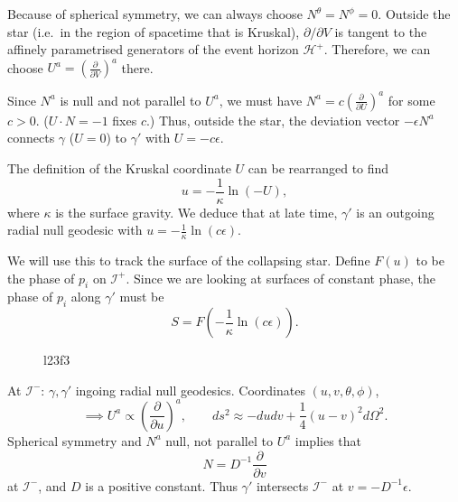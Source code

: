 Because of spherical symmetry, we can always choose $N^{\theta} = N^{\phi} = 0$.
Outside the star (i.e.~in the region of spacetime that is Kruskal), $\partial / \partial V$ is tangent to the affinely parametrised generators of the event horizon $\mathcal{H}^+$.
Therefore, we can choose $U^{a} = (\frac{\partial }{\partial V})^{a}$ there.

Since $N^{a}$ is null and not parallel to $U^{a}$, we must have $N^{a} = c (\frac{\partial }{\partial U})^{a}$ for some $c> 0$. ($U \cdot N = -1$ fixes $c$.)
Thus, outside the star, the deviation vector $- \epsilon N^{a}$ connects $\gamma$ ($U = 0$) to $\gamma'$ with $U = -c \epsilon$.

The definition of the Kruskal coordinate $U$ can be rearranged to find 
\begin{equation}
  u = - \frac{1}{\kappa} \ln(-U),
\end{equation}
where $\kappa$ is the surface gravity.
We deduce that at late time, $\gamma'$ is an outgoing radial null geodesic with $u = -\frac{1}{\kappa} \ln(c \epsilon)$.

We will use this to track the surface of the collapsing star.
Define $F(u)$ to be the phase of $p_i$ on $\mathscr{I}^+$. Since we are looking at surfaces of constant phase, the phase of $p_i$ along $\gamma'$ must be 
\begin{equation}
  \label{eq:23-star}
  S = F(-\frac{1}{\kappa} \ln(c \epsilon)).
\end{equation}

\begin{figure}[tbhp]
  \centering
  \caption{l23f3}
  \label{fig:l23f3}
\end{figure}

At $\mathscr{I}^-$: $\gamma, \gamma'$ ingoing radial null geodesics. Coordinates $(u, v, \theta, \phi)$,
\begin{equation}
  \implies U^{a} \propto \left( \frac{\partial }{\partial u} \right)^{a}, \qquad ds^2 \approx -du d v + \frac{1}{4} (u - v)^2 d \Omega^2.
\end{equation}
Spherical symmetry and $N^{a}$ null, not parallel to $U^{a}$ implies that 
\begin{equation}
  N = D^{-1} \frac{\partial }{\partial v}
\end{equation}
at $\mathscr{I}^-$, and $D$ is a positive constant.
Thus $\gamma'$ intersects $\mathscr{I}^-$ at $v = -D^{-1} \epsilon$.

